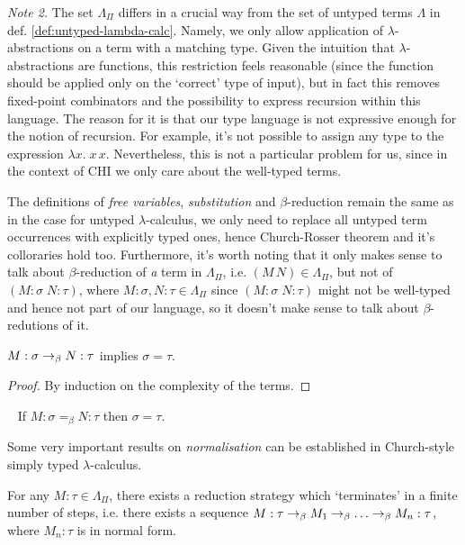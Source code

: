 \emph{Note 2.}
    The set $\Lambda_\Pi$ differs in a crucial way from the set of
    untyped terms $\Lambda$ in def.  \ref{def:untyped-lambda-calc}.
    Namely, we only allow application of $\lambda$-abstractions on a
    term with a matching type.  Given the intuition that
    $\lambda$-abstractions are functions, this restriction feels
    reasonable (since the function should be applied only on the
    `correct' type of input), but in fact this removes fixed-point
    combinators and the possibility to express recursion within this
    language. The reason for it is that our type language is not
    expressive enough for the notion of recursion. For example, it's
    not possible to assign any type to the expression $\lambda x.\; x\,
    x$. Nevertheless, this is not a particular problem for us, since in
    the context of CHI we only care about the well-typed terms.

The definitions of \emph{free variables}, \emph{substitution} and
$\beta$-reduction remain the same as in the case for untyped
$\lambda$-calculus, we only need to replace all untyped term occurrences with
explicitly typed ones, hence Church-Rosser theorem and it's colloraries hold
too. Furthermore, it's worth noting that it only makes sense to talk about
$\beta$-reduction of \emph{a} term in $\Lambda_\Pi$, i.e. $(M\, N) \in
\Lambda_\Pi$, but not of $(M\!:\!\sigma\; N\!:\!\tau)$, where $M:\sigma, N:\tau
\in \Lambda_\Pi$ since $(M\!:\!\sigma\; N\!:\!\tau)$ might not be well-typed
and hence not part of our language, so it doesn't make sense to talk about
$\beta$-redutions of it.

\begin{proposition}
    $M:\sigma \rightarrow_\beta N:\tau$ implies $\sigma = \tau$.
\end{proposition}
\begin{proof}
    By induction on the complexity of the terms.
\end{proof}

\begin{corollary} {\ }
\label{cor:uniquenessoftypes}
    If $M:\sigma =_\beta N:\tau$ then $\sigma = \tau$.
\end{corollary}

Some very important results on \emph{normalisation} can be established in
Church-style simply typed $\lambda$-calculus.
\begin{theorem}
    For any $M:\tau \in \Lambda_\Pi$, there exists a reduction strategy which
    `terminates' in a finite number of steps, i.e. there exists a sequence
    $M:\tau \rightarrow_\beta M_1 \rightarrow_\beta \ldots \rightarrow_\beta M_n:\tau$, where $M_n:\tau$
    is in normal form.
\end{theorem}

